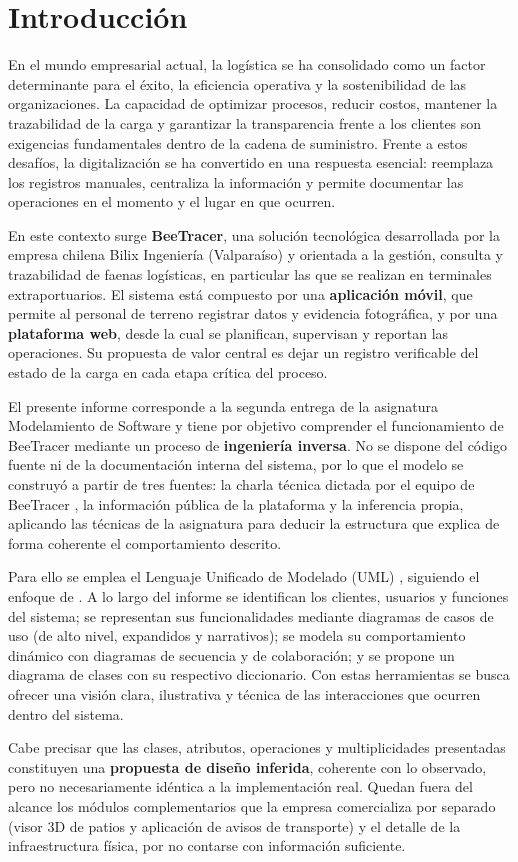 \chapter{Introducción}
\label{cap:introduccion}

En el mundo empresarial actual, la logística se ha consolidado como un factor determinante para el
éxito, la eficiencia operativa y la sostenibilidad de las organizaciones. La capacidad de optimizar
procesos, reducir costos, mantener la trazabilidad de la carga y garantizar la transparencia frente
a los clientes son exigencias fundamentales dentro de la cadena de suministro. Frente a estos
desafíos, la digitalización se ha convertido en una respuesta esencial: reemplaza los registros
manuales, centraliza la información y permite documentar las operaciones en el momento y el lugar
en que ocurren.

En este contexto surge \textbf{BeeTracer}, una solución tecnológica desarrollada por la empresa
chilena Bilix Ingeniería (Valparaíso) y orientada a la gestión, consulta y trazabilidad de faenas
logísticas, en particular las que se realizan en terminales extraportuarios. El sistema está
compuesto por una \textbf{aplicación móvil}, que permite al personal de terreno registrar datos y
evidencia fotográfica, y por una \textbf{plataforma web}, desde la cual se planifican, supervisan y
reportan las operaciones. Su propuesta de valor central es dejar un registro verificable del estado
de la carga en cada etapa crítica del proceso.

El presente informe corresponde a la segunda entrega de la asignatura Modelamiento de Software y
tiene por objetivo comprender el funcionamiento de BeeTracer mediante un proceso de
\textbf{ingeniería inversa}. No se dispone del código fuente ni de la documentación interna del
sistema, por lo que el modelo se construyó a partir de tres fuentes: la charla técnica dictada por
el equipo de BeeTracer \parencite{charlabeetracer2026}, la información pública de la plataforma
\parencite{bilix_sf} y la inferencia propia, aplicando las técnicas de la asignatura para deducir
la estructura que explica de forma coherente el comportamiento descrito.

Para ello se emplea el Lenguaje Unificado de Modelado (UML) \parencite{omg2017}, siguiendo el
enfoque de \textcite{larman2003}. A lo largo del informe se identifican los clientes, usuarios y
funciones del sistema; se representan sus funcionalidades mediante diagramas de casos de uso (de
alto nivel, expandidos y narrativos); se modela su comportamiento dinámico con diagramas de
secuencia y de colaboración; y se propone un diagrama de clases con su respectivo diccionario. Con
estas herramientas se busca ofrecer una visión clara, ilustrativa y técnica de las interacciones
que ocurren dentro del sistema.

Cabe precisar que las clases, atributos, operaciones y multiplicidades presentadas constituyen una
\textbf{propuesta de diseño inferida}, coherente con lo observado, pero no necesariamente idéntica
a la implementación real. Quedan fuera del alcance los módulos complementarios que la empresa
comercializa por separado (visor 3D de patios y aplicación de avisos de transporte) y el detalle de
la infraestructura física, por no contarse con información suficiente.

